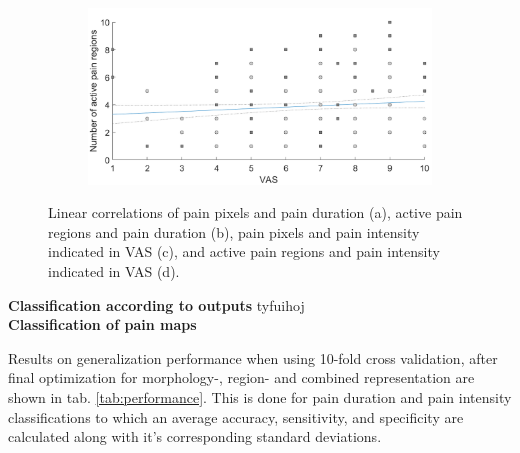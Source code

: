 \begin{figure} [t!]
\begin{tcolorbox}[colframe=black!30!black, colback=white]
\begin{subfigure}[b]{0.51\textwidth}
    \caption{}
    \label{fig:3}
  \end{subfigure}
  \hfill
  \hspace{2mm}
  \begin{subfigure}[b]{0.51\textwidth}
    \includegraphics[width=\textwidth]{Figures/vasregion}
       \caption{ }
    \label{fig:4}
  \end{subfigure}  
  \caption{Linear correlations of pain pixels and pain duration (a), active pain regions and pain duration (b), pain pixels and pain intensity indicated in VAS (c), and active pain regions and pain intensity indicated in VAS (d).}
  \label{fig:correlations}
\end{tcolorbox}
\end{figure}

\newpage

\noindent
\textbf{Classification according to outputs}\newline
\noindent
tyfuihoj \\


\noindent
\textbf{Classification of pain maps}\newline
\noindent








Results on generalization performance when using 10-fold cross validation, after final optimization for morphology-, region- and combined representation are shown in tab. \ref{tab:performance}. This is done for pain duration and pain intensity classifications to which an average accuracy, sensitivity, and specificity are calculated along with it’s corresponding standard deviations. 


